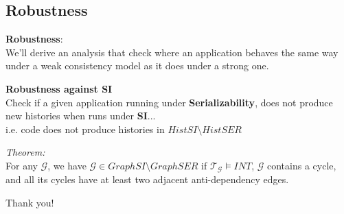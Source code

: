 \documentclass{beamer}
\begin{document}
\subsection{Robustness}

\begin{frame}
	\textbf{Robustness}: \\
	We'll derive an analysis that check where an application behaves the same way under a weak consistency model as it does under a strong one.
\end{frame}

\begin{frame}
	\textbf{Robustness against SI} \\
	Check if a given application running under \textbf{Serializability}, does not produce new histories when runs under \textbf{SI}... \\
	i.e. code does not produce histories in $HistSI \setminus HistSER$
\end{frame}


\begin{frame}
\textit{Theorem:} \\
For any $\mathcal{G}$, we have $\mathcal{G} \in GraphSI \setminus GraphSER $ if $\mathcal{T}_\mathcal{G} \vDash INT$, $\mathcal{G}$ contains a cycle, and all its cycles have at least two adjacent anti-dependency edges.
\end{frame}

\begin{frame}
\begin{center}
	Thank you!
\end{center}
\end{frame}
\end{document}
